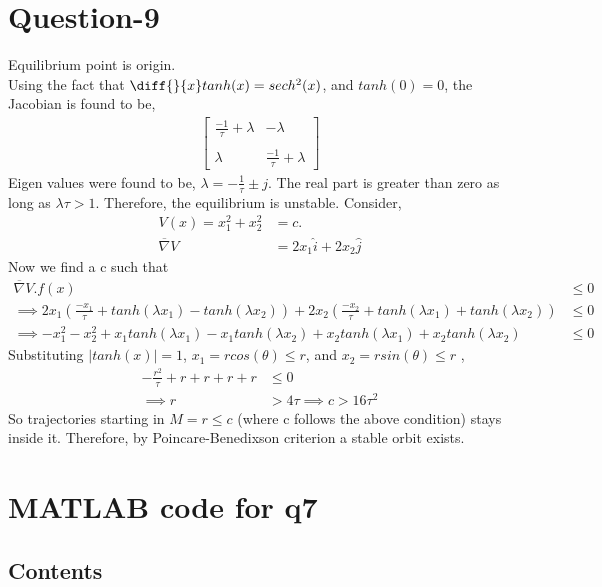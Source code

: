 \documentclass{article}
\begin{document}
\section*{Question-9}
Equilibrium point is origin. \\
Using the fact that $\diff{}{x}tanh(x) = sech^2(x)$, and $tanh(0) = 0$, the Jacobian is found to be, \\
\begin{align*}
    \begin{bmatrix}  \frac{-1}{\tau} + \lambda & -\lambda \\\\ \lambda & \frac{-1}{\tau} + \lambda \end{bmatrix}
\end{align*}
Eigen values were found to be, $\lambda = - \frac{1}{\tau} \pm j$. The real part is greater than zero as long as $\lambda\tau > 1$. Therefore, the equilibrium is unstable.
Consider,
\begin{align}
    V(x) = x_1^2 + x_2^2 &= c. \\
    \overline{\nabla}V &= 2x_1\hat{i} + 2x_2\hat{j}
\end{align}
Now we find a c such that
\begin{align*}
    \overline{\nabla}V.f(x) &\leq 0 \\
    \implies 2x_1(\frac{-x_1}{\tau} + tanh({\lambda}x_1) - tanh({\lambda}x_2)) + 2x_2(\frac{-x_2}{\tau} + tanh({\lambda}x_1) + tanh({\lambda}x_2)) &\leq 0 \\
    \implies -x_1^2 - x_2^2 + x_1tanh({\lambda}x_1) - x_1tanh({\lambda}x_2) + x_2tanh({\lambda}x_1) + x_2tanh({\lambda}x_2) &\leq 0
\end{align*}
Substituting $|tanh(x)| = 1$, $x_1 = rcos(\theta) \leq r$, and $x_2 = rsin(\theta) \leq r$ ,
\begin{align*}
    -\frac{r^2}{\tau} + r + r + r + r &\leq 0 \\
    \implies r &> 4\tau \implies c > 16\tau^2
\end{align*}
So trajectories starting in $M = {r \leq c}$ (where c follows the above condition) stays inside it. Therefore, by Poincare-Benedixson criterion a stable orbit exists.


\section*{MATLAB code for q7}
\subsection*{Contents}
\end{document}
